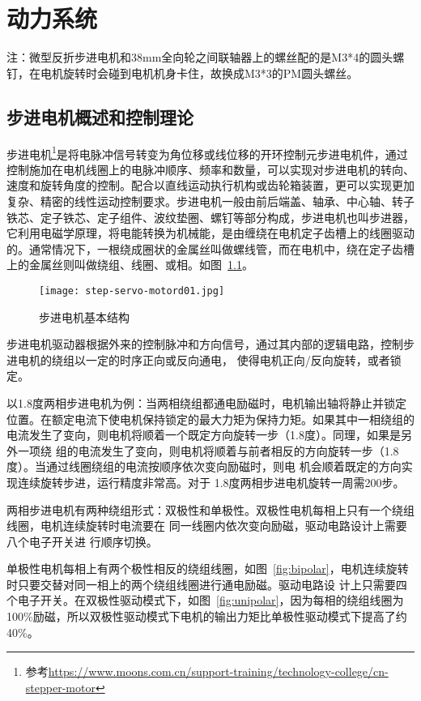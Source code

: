 \chapter{动力系统}
\label{cha:Motor}

注：微型反折步进电机和38mm全向轮之间联轴器上的螺丝配的是M3*4的圆头螺钉，在电机旋转时会碰到电机机身卡住，故换成M3*3的PM圆头螺丝。

\section{步进电机概述和控制理论}

步进电机\footnote{参考\url{https://www.moons.com.cn/support-training/technology-college/cn-stepper-motor}}是将电脉冲信号转变为角位移或线位移的开环控制元步进电机件，通过控制施加在电机线圈上的电脉冲顺序、频率和数量，可以实现对步进电机的转向、速度和旋转角度的控制。配合以直线运动执行机构或齿轮箱装置，更可以实现更加复杂、精密的线性运动控制要求。步进电机一般由前后端盖、轴承、中心轴、转子铁芯、定子铁芯、定子组件、波纹垫圈、螺钉等部分构成，步进电机也叫步进器，它利用电磁学原理，将电能转换为机械能，是由缠绕在电机定子齿槽上的线圈驱动的。通常情况下，一根绕成圈状的金属丝叫做螺线管，而在电机中，绕在定子齿槽上的金属丝则叫做绕组、线圈、或相。如图~\ref{fig:Stepper-Motor-Open}。

\begin{figure}[htbp]
    \centering
    \texttt{[image: step-servo-motord01.jpg]}
    \caption{步进电机基本结构}
    \label{fig:Stepper-Motor-Open}
\end{figure}

步进电机驱动器根据外来的控制脉冲和方向信号，通过其内部的逻辑电路，控制步进电机的绕组以一定的时序正向或反向通电， 使得电机正向/反向旋转，或者锁定。

以1.8度两相步进电机为例：当两相绕组都通电励磁时，电机输出轴将静止并锁定位置。在额定电流下使电机保持锁定的最大力矩为保持力矩。如果其中一相绕组的电流发生了变向，则电机将顺着一个既定方向旋转一步（1.8度）。同理，如果是另外一项绕 组的电流发生了变向，则电机将顺着与前者相反的方向旋转一步（1.8度）。当通过线圈绕组的电流按顺序依次变向励磁时，则电 机会顺着既定的方向实现连续旋转步进，运行精度非常高。对于 1.8度两相步进电机旋转一周需200步。

两相步进电机有两种绕组形式：双极性和单极性。双极性电机每相上只有一个绕组线圈，电机连续旋转时电流要在 同一线圈内依次变向励磁，驱动电路设计上需要八个电子开关进 行顺序切换。

单极性电机每相上有两个极性相反的绕组线圈，如图~\ref{fig:bipolar}，电机连续旋转时只要交替对同一相上的两个绕组线圈进行通电励磁。驱动电路设 计上只需要四个电子开关。在双极性驱动模式下，如图~\ref{fig:unipolar}，因为每相的绕组线圈为100\%励磁，所以双极性驱动模式下电机的输出力矩比单极性驱动模式下提高了约 40\%。

